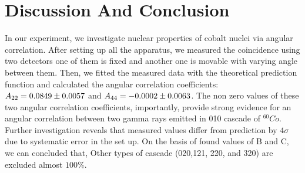 \section{Discussion And Conclusion}
In our experiment, we investigate nuclear properties of cobalt nuclei via angular correlation. After setting up all the apparatus, we measured the coincidence using two detectors one of them is fixed and another one is movable with varying angle between them. Then, we fitted the measured data with the theoretical prediction function and calculated the angular correlation coefficients:  $ A_{22}= \num{0.0849 +- 0.0057} $ and $A_{44}=\num{-0.0002 +- 0.0063} $. The non zero values of these two angular correlation coefficients, importantly, provide strong evidence for an angular correlation between two gamma rays emitted in 010 cascade of $ ^{60}Co $. Further investigation reveals that measured values differ from prediction by $4\sigma$ due to systematic error in the set up. On the basis of found values of B and C, we can concluded that, Other types of cascade (020,121, 220, and 320) are excluded almost $100\%$. 
